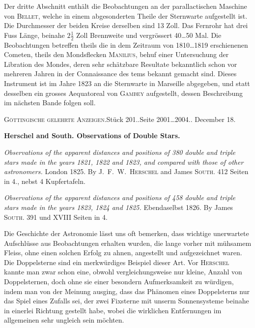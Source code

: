 \documentclass[12pt,a4paper]{article}
\newcommand{\anzeigeheading}[4]{%
    \begin{center}
    \small\textsc{G\"ottingische gelehrte Anzeigen.}\quad St\"uck #1.\quad Seite #2.\quad #3
    \end{center}
    \vspace{-2mm}
    \begin{center}\small\textbf{#4}\end{center}
    \vspace{2mm}
}
\begin{document}
Der dritte Abschnitt enth\"alt die Beobachtungen an der parallactischen Maschine von \textsc{Bellet}, welche in einem abgesonderten Theile der Sternwarte aufgestellt ist. Die Durchmesser der beiden Kreise derselben sind 13 Zoll. Das Fernrohr hat drei Fuss L\"ange, beinahe $2\frac{1}{2}$ Zoll Brennweite und vergr\"ossert 40\dots 50 Mal. Die Beobachtungen betreffen theils die in dem Zeitraum von 1810\dots 1819 erschienenen Cometen, theils den Mondsflecken \textsc{Manilius}, behuf einer Untersuchung der Libration des Mondes, deren sehr sch\"atzbare Resultate bekanntlich schon vor mehreren Jahren in der Connaissance des tems bekannt gemacht sind. Dieses Instrument ist im Jahre 1823 an die Sternwarte in Marseille abgegeben, und statt desselben ein grosses Aequatoreal von \textsc{Gambey} aufgestellt, dessen Beschreibung im n\"achsten Bande folgen soll.

\anzeigeheading{201.}{2001\dots 2004.}{1826 December 18.}{Herschel and South. Observations of Double Stars.}

\begin{otherlanguage}{english}
\noindent\small\textit{Observations of the apparent distances and positions of 380 double and triple stars made in the years 1821, 1822 and 1823, and compared with those of other astronomers.} London 1825. By J.\ F.\ W.\ \textsc{Herschel} and James \textsc{South}. 412 Seiten in 4., nebst 4 Kupfertafeln.

\textit{Observations of the apparent distances and positions of 458 double and triple stars made in the years 1823, 1824 and 1825.} Ebendaselbst 1826. By James \textsc{South}. 391 und XVIII Seiten in 4.
\end{otherlanguage}

\vspace{2mm}

Die Geschichte der Astronomie l\"asst uns oft bemerken, dass wichtige unerwartete Aufschl\"usse aus Beobachtungen erhalten wurden, die lange vorher mit m\"uhsamem Fleiss, ohne einen solchen Erfolg zu ahnen, angestellt und aufgezeichnet waren. Die Doppelsterne sind ein merkw\"urdiges Beispiel dieser Art. Vor \textsc{Herschel} kannte man zwar schon eine, obwohl vergleichungsweise nur kleine, Anzahl von Doppelsternen, doch ohne sie einer besondern Aufmerksamkeit zu w\"urdigen, indem man von der Meinung ausging, dass das Ph\"anomen eines Doppelsterns nur das Spiel eines Zufalls sei, der zwei Fixsterne mit unserm Sonnensysteme beinahe in einerlei Richtung gestellt habe, wobei die wirklichen Entfernungen im allgemeinen sehr ungleich sein m\"ochten.
\end{document}
